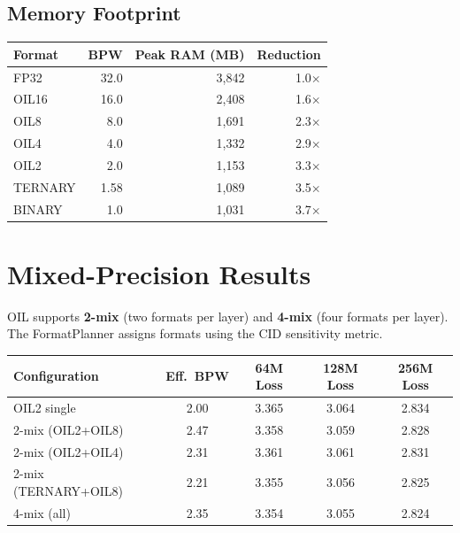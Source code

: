 \subsection{Memory Footprint}
\begin{center}
\begin{tabular}{lrrr}
\toprule
\textbf{Format} & \textbf{BPW} & \textbf{Peak RAM (MB)} & \textbf{Reduction} \\
\midrule
FP32      & 32.0 & 3{,}842 & 1.0$\times$ \\
OIL16     & 16.0 & 2{,}408 & 1.6$\times$ \\
OIL8      & 8.0  & 1{,}691 & 2.3$\times$ \\
OIL4      & 4.0  & 1{,}332 & 2.9$\times$ \\
OIL2      & 2.0  & 1{,}153 & 3.3$\times$ \\
TERNARY   & 1.58 & 1{,}089 & 3.5$\times$ \\
BINARY    & 1.0  & 1{,}031 & 3.7$\times$ \\
\bottomrule
\end{tabular}
\end{center}
\begin{table}[h]
\centering
\caption{Peak resident memory during training of the 256M model.}
\label{tab:memory}
\end{table}
\section{Mixed-Precision Results}
\label{sec:mixed_precision}
OIL supports \textbf{2-mix} (two formats per layer) and \textbf{4-mix} (four formats per
layer). The FormatPlanner assigns formats using the CID sensitivity metric.
\begin{center}
\begin{tabular}{lcccc}
\toprule
\textbf{Configuration} & \textbf{Eff.\ BPW} & \textbf{64M Loss} & \textbf{128M Loss} & \textbf{256M Loss} \\
\midrule
OIL2 single           & 2.00 & 3.365 & 3.064 & 2.834 \\
2-mix (OIL2+OIL8)     & 2.47 & 3.358 & 3.059 & 2.828 \\
2-mix (OIL2+OIL4)     & 2.31 & 3.361 & 3.061 & 2.831 \\
2-mix (TERNARY+OIL8)  & 2.21 & 3.355 & 3.056 & 2.825 \\
4-mix (all)           & 2.35 & 3.354 & 3.055 & 2.824 \\
\bottomrule
\end{tabular}
\end{center}
\begin{table}[h]
\centering
\caption{Mixed-precision results. Effective BPW is the weighted average across all layers.}
\label{tab:mixed_results}
\end{table}
